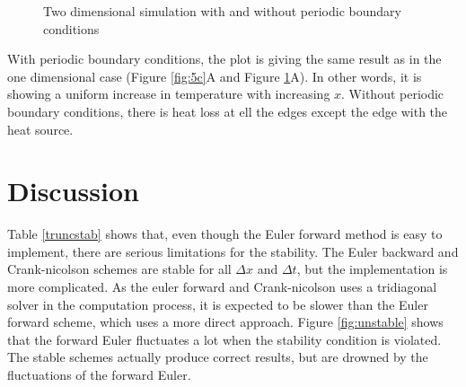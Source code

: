 \documentclass[10pt,a4paper]{article}
\begin{document}
\begin{figure} [H]
	\centering
	\caption{\label{fig:5d} Two dimensional simulation with and without periodic boundary conditions}
\end{figure}

\noindent With periodic boundary conditions, the plot is giving the same result as in the one dimensional case (Figure \ref{fig:5c}A and Figure \ref{fig:5d}A). In other words, it is showing a uniform increase in temperature with increasing $x$.   Without periodic boundary conditions, there is heat loss at ell the edges except the edge with the heat source. 


\newpage
\section*{Discussion}

Table \ref{truncstab} shows that, even though the Euler forward method is easy to implement, there are serious limitations for the stability. The Euler backward and Crank-nicolson schemes are stable for all $\Delta x$ and $\Delta t$, but the implementation is more complicated. As the euler forward and Crank-nicolson uses a tridiagonal solver in the computation process, it is expected to be slower than the Euler forward scheme, which uses a more direct approach. Figure \ref{fig:unstable} shows that the forward Euler fluctuates a lot when the stability condition is violated. The stable schemes actually produce correct results, but are drowned by the fluctuations of the forward Euler. 
\\
\end{document}
